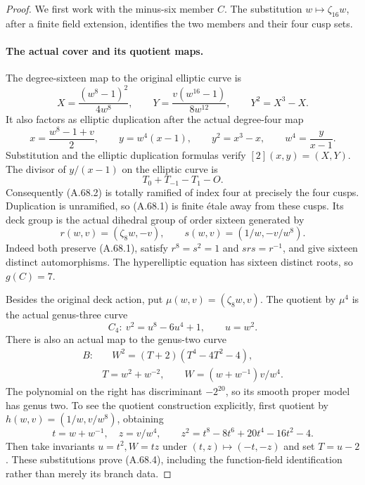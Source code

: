 \begin{proof}
We first work with the minus-six member \(C\). The substitution
\(w\mapsto\zeta_{16}w\), after a finite field extension, identifies
the two members and their four cusp sets.

\paragraph{The actual cover and its quotient maps.}
The degree-sixteen map to the original elliptic curve is
\[
 X=\frac{(w^8-1)^2}{4w^8},\qquad
 Y=\frac{v(w^{16}-1)}{8w^{12}},\qquad Y^2=X^3-X.
                                                               \tag{A.68.1}
\]
It also factors as elliptic duplication after the actual degree-four map
\[
 x=\frac{w^8-1+v}{2},\qquad y=w^4(x-1),
 \qquad y^2=x^3-x,\qquad w^4=\frac{y}{x-1}.           \tag{A.68.2}
\]
Substitution and the elliptic duplication formulas verify
\([2](x,y)=(X,Y)\). The divisor of \(y/(x-1)\) on the elliptic
curve is
\[
                 T_0+T_{-1}-T_1-O.
\]
Consequently (A.68.2) is totally ramified of index four at precisely
the four cusps. Duplication is unramified, so (A.68.1) is finite
\'{e}tale away from these cusps. Its deck group is the actual dihedral
group of order sixteen generated by
\[
 r(w,v)=(\zeta_8w,-v),\qquad s(w,v)=(1/w,-v/w^8).
\]
Indeed both preserve (A.68.1), satisfy \(r^8=s^2=1\) and
\(srs=r^{-1}\), and give sixteen distinct automorphisms.
The hyperelliptic equation has sixteen distinct roots, so \(g(C)=7\).

Besides the original deck action, put
\(\mu(w,v)=(\zeta_8w,v)\). The quotient by \(\mu^4\) is the
actual genus-three curve
\[
 C_4:\ v^2=u^8-6u^4+1,\qquad u=w^2.                 \tag{A.68.3}
\]
There is also an actual map to the genus-two curve
\[
 \begin{split}
 B:&\quad W^2=(T+2)(T^4-4T^2-4),\\
 &T=w^2+w^{-2},\qquad W=(w+w^{-1})v/w^4.
 \end{split}                                                   \tag{A.68.4}
\]
The polynomial on the right has discriminant \(-2^{20}\),
so its smooth proper model has genus two. To see the quotient
construction explicitly, first quotient by
\(h(w,v)=(1/w,v/w^8)\), obtaining
\[
 t=w+w^{-1},\quad z=v/w^4,\qquad
 z^2=t^8-8t^6+20t^4-16t^2-4.
\]
Then take invariants \(u=t^2,W=tz\) under \((t,z)\mapsto(-t,-z)\)
and set \(T=u-2\). These substitutions prove (A.68.4), including
the function-field identification rather than merely its branch data.


\end{proof}
